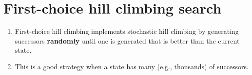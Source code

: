 \section{First-choice hill climbing search \cite{ai/book/Artificial-Intelligence-A-Modern-Approach/Russell-Norvig}}
\label{AI: Algorithms/First-choice hill climbing search}

\begin{enumerate}
    \item First-choice hill climbing implements stochastic hill climbing by generating successors \textbf{randomly} until one is generated that is better than the current state. 
    \hfill \cite{ai/book/Artificial-Intelligence-A-Modern-Approach/Russell-Norvig}
    
    \item This is a good strategy when a state has many (e.g., thousands) of successors.
    \hfill \cite{ai/book/Artificial-Intelligence-A-Modern-Approach/Russell-Norvig}
\end{enumerate}














